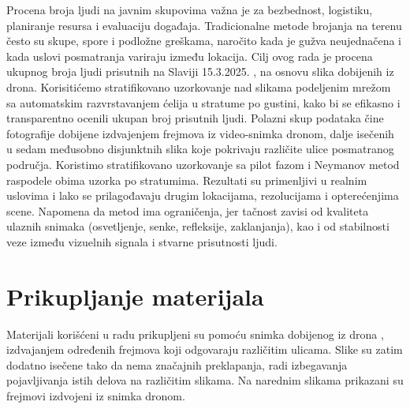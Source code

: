 \documentclass[a4paper,12pt]{article}
\begin{document}
Procena broja ljudi na javnim skupovima važna je za bezbednost, logistiku, planiranje resursa i evaluaciju događaja. Tradicionalne metode brojanja na terenu često su skupe, spore i podložne greškama, naročito kada je gužva neujednačena i kada uslovi posmatranja variraju između lokacija.
Cilj ovog rada je procena ukupnog broja ljudi prisutnih na Slaviji 15.3.2025. , na osnovu slika dobijenih iz drona. 
\newline
\newline
\noindent Korisitićemo stratifikovano uzorkovanje nad slikama podeljenim mrežom sa automatskim razvrstavanjem ćelija u stratume po gustini, kako bi se efikasno i transparentno ocenili ukupan broj prisutnih ljudi.
Polazni skup podataka čine fotografije dobijene izdvajenjem frejmova iz video-snimka dronom, dalje isečenih u sedam međusobno disjunktnih slika koje pokrivaju različite ulice posmatranog područja.
Koristimo stratifikovano uzorkovanje sa pilot fazom i Neymanov metod raspodele obima uzorka po stratumima.
\newline
\newline
\noindent Rezultati su primenljivi u realnim uslovima i lako se prilagođavaju drugim lokacijama, rezolucijama i opterećenjima scene.
\newline
\newline
\noindent Napomena da metod ima ograničenja, jer tačnost zavisi od kvaliteta ulaznih snimaka (osvetljenje, senke, refleksije, zaklanjanja), kao i od stabilnosti veze između vizuelnih signala i stvarne prisutnosti ljudi.




\newpage
\section{Prikupljanje materijala}

Materijali korišćeni u radu prikupljeni su pomoću snimka dobijenog iz drona \cite{drone_video}, izdvajanjem određenih frejmova koji odgovaraju različitim ulicama. Slike su zatim dodatno isečene tako da nema značajnih preklapanja, radi izbegavanja pojavljivanja istih delova na različitim slikama.
Na narednim slikama prikazani su frejmovi izdvojeni iz snimka dronom.
\end{document}

